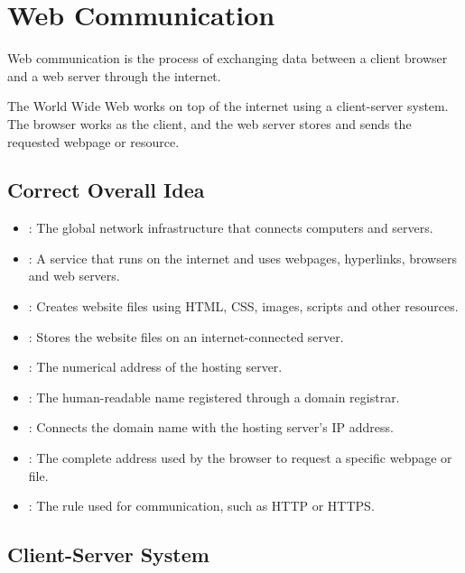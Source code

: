 \section{Web Communication}

\begin{definitionbox}
Web communication is the process of exchanging data between a client browser and a web server through the internet.
\end{definitionbox}

\Note The World Wide Web works on top of the internet using a client-server system. The browser works as the client, and the web server stores and sends the requested webpage or resource.

\subsection{Correct Overall Idea}

\begin{itemize}
    \item {}: The global network infrastructure that connects computers and servers.
    \item {}: A service that runs on the internet and uses webpages, hyperlinks, browsers and web servers.
    \item {}: Creates website files using HTML, CSS, images, scripts and other resources.
    \item {}: Stores the website files on an internet-connected server.
    \item {}: The numerical address of the hosting server.
    \item {}: The human-readable name registered through a domain registrar.
    \item {}: Connects the domain name with the hosting server's IP address.
    \item {}: The complete address used by the browser to request a specific webpage or file.
    \item {}: The rule used for communication, such as HTTP or HTTPS.
\end{itemize}

\subsection{Client-Server System}

